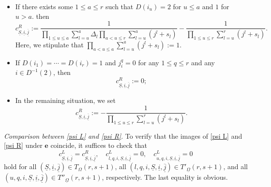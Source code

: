 \documentclass[12pt, a4paper]{article}
\begin{document}
\begin{itemize}
    \item If there exists some $1\leq a\leq r$ such that 
    $D(i_u)=2$ for $u\leq a$ and $1$ for $u>a$.
    then 
    $$
    c^R_{\underline S,\underline i,\underline{\overline j}}:=\frac{1}{\prod_{1\leq u\leq a
    }\sum_{l=u}^a\Delta_l\prod_{a<u\leq r}\sum_{l=u}^a(j^l+s_l)}-\frac{1}{\prod_{1\leq u\leq r}\sum_{l=u}^r(j^l+s_l)}.
    $$
    Here, we stipulate that $\prod_{a<u\leq a}\sum_{l=u}^a(j^l+s_l):=1$.
    \item If $D(i_1)=\cdots=D(i_r)=1$ and $j^q_i=0$ for any $1\leq q\leq r$ and any $i\in D^{-1}(2)$, then 
    $$
    c^R_{\underline S,\underline i,    \underline{\overline j}}:=0;
    $$
    \item In the remaining situation, we set
    $$
    c^R_{\underline S,\underline i,\underline{\overline j}}:=-\frac{1}{\prod_{1\leq u\leq r}\sum_{l=u}^r(j^l+s_l)}.
    $$
\end{itemize}

\emph{Comparison between \eqref{psi L} and \eqref{psi R}}.
To verify that the images of \eqref{psi L} and \eqref{psi R} under \( \boldsymbol{e} \) coincide, it suffices to check that
\[
c^L_{\underline{S},\underline{i},\underline{\overline{j}}}
= c^R_{\underline{S},\underline{i},\underline{\overline{j}}}, \quad
c^L_{l,q,i,\underline{S},\underline{i},\underline{\overline{j}}} = 0, \quad
c^L_{u,q,i,\underline{S},\underline{i},\underline{\overline{j}}} = 0
\]
hold for all \( (\underline{S}, \underline{i}, \underline{\overline{j}}) \in T_{\Omega}(r, s+1) \), all \( (l, q, i, \underline{S}, \underline{i}, \underline{\overline{j}}) \in T'_{\underline{\Omega}}(r, s+1) \), and all \( (u, q, i, \underline{S}, \underline{i}, \underline{\overline{j}}) \in T''_{\underline{\Omega}}(r, s+1) \), respectively. The last equality is obvious. 
\end{document}
